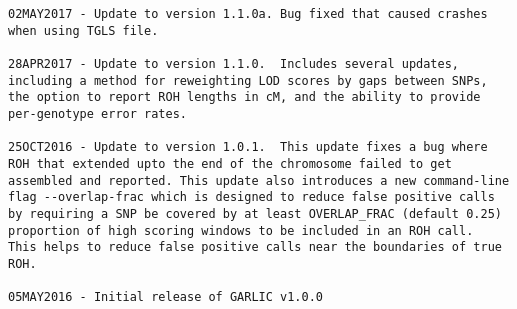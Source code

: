 \documentclass[12pt]{article}%
\begin{document}
\begin{lstlisting}
02MAY2017 - Update to version 1.1.0a. Bug fixed that caused crashes when using TGLS file. 

28APR2017 - Update to version 1.1.0.  Includes several updates, including a method for reweighting LOD scores by gaps between SNPs, the option to report ROH lengths in cM, and the ability to provide per-genotype error rates.

25OCT2016 - Update to version 1.0.1.  This update fixes a bug where ROH that extended upto the end of the chromosome failed to get assembled and reported. This update also introduces a new command-line flag --overlap-frac which is designed to reduce false positive calls by requiring a SNP be covered by at least OVERLAP_FRAC (default 0.25) proportion of high scoring windows to be included in an ROH call.  This helps to reduce false positive calls near the boundaries of true ROH.

05MAY2016 - Initial release of GARLIC v1.0.0
\end{lstlisting}


\end{document}
